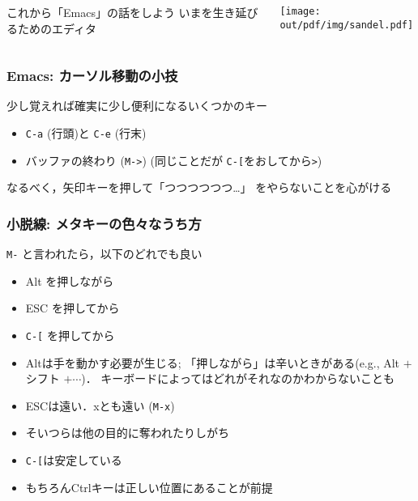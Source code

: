 \documentclass[12pt,dvipdfmx]{beamer}
\newcommand{\ao}[1]{{\color{blue}#1}}
\newcommand{\aka}[1]{{\color{red}#1}}
\begin{document}
\begin{frame}
  \begin{columns}
    \begin{column}{0.5\textwidth}
{\huge これから「Emacs」の話をしよう}
\vskip1cm
{\large いまを生き延びるためのエディタ}
    \end{column}
    \begin{column}{0.5\textwidth}
\texttt{[image: out/pdf/img/sandel.pdf]}
    \end{column}
  \end{columns}
  \begin{center}
  \end{center}

\end{frame}

\begin{frame}
\frametitle{Emacs: カーソル移動の小技}
少し覚えれば確実に少し便利になるいくつかのキー

\begin{itemize}
\item \texttt{\ao{C-a}} (行頭)と \texttt{\ao{C-e}} (行末)
\item バッファの終わり (\texttt{\ao{M->}}) 
(同じことだが \texttt{\ao{C-[}}をおしてから\texttt{\ao{>}})
\end{itemize}

なるべく，矢印キーを押して「つつつつつつ\ldots 」
をやらないことを心がける

\end{frame}

\begin{frame}
\frametitle{小脱線: メタキーの色々なうち方}
\ao{\texttt{M-}} と言われたら，以下のどれでも良い

\begin{itemize}
\item<2-> Alt を\aka{押しながら}
\item<3-> ESC を\ao{押してから}
\item<4-> {\LARGE\ao{\tt C-[} を押してから}
\end{itemize}


\begin{itemize}
\item<7-> Altは手を動かす必要が生じる; 「押しながら」は辛いときがある(e.g., Alt $+$ シフト $+ \cdots$)．
キーボードによってはどれがそれなのかわからないことも
\item<8-> ESCは遠い．xとも遠い (\ao{\texttt{M-x}})
\item<9-> そいつらは他の目的に奪われたりしがち
\item<10-> \texttt{\ao{C-[}}は安定している
\item<11-> {\footnotesize もちろんCtrlキーは正しい位置にあることが前提}
\end{itemize}
\end{frame}
\end{document}
